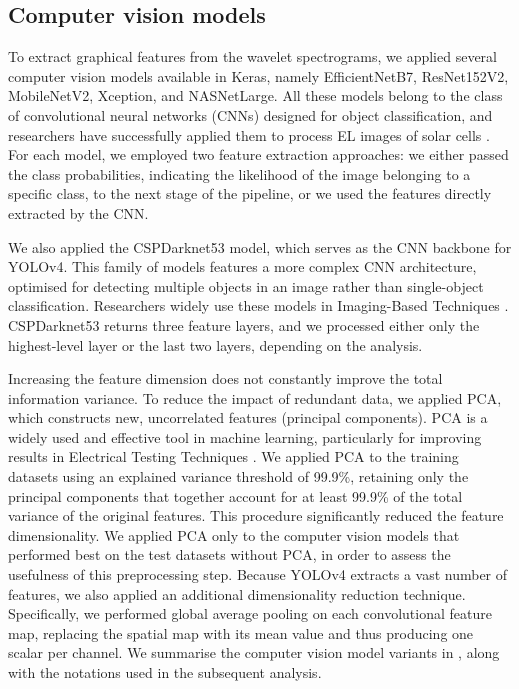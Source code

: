 \documentclass[10pt]{iopart}
\begin{document}
\subsection{Computer vision models}\label{subsec:CompVisMod}

To extract graphical features from the wavelet spectrograms, we applied several computer vision models available in Keras, namely EfficientNetB7, ResNet152V2, MobileNetV2, Xception, and NASNetLarge. 
All these models belong to the class of convolutional neural networks (CNNs) designed for object classification, and researchers have successfully applied them to process EL images of solar cells \cite{Jia2024, Otamendi2021, Chen2022, Abdelsattar2025, tella2025}. 
For each model, we employed two feature extraction approaches: we either passed the class probabilities, indicating the likelihood of the image belonging to a specific class, to the next stage of the pipeline, or we used the features directly extracted by the CNN.


We also applied the CSPDarknet53 model, which serves as the CNN backbone for YOLOv4. 
This family of models features a more complex CNN architecture, optimised for detecting multiple objects in an image rather than single-object classification. 
Researchers widely use these models in Imaging-Based Techniques \cite{Liu2024a, Li2024a, Chen2022}. 
CSPDarknet53 returns three feature layers, and we processed either only the highest-level layer or the last two layers, depending on the analysis.


Increasing the feature dimension does not constantly improve the total information variance. 
To reduce the impact of redundant data, we applied PCA, which constructs new, uncorrelated features (principal components). 
PCA is a widely used and effective tool in machine learning, particularly for improving results in Electrical Testing Techniques \cite{Fadhel2019, Gao2020}.
We applied PCA to the training datasets using an explained variance threshold of 99.9\%, retaining only the principal components that together account for at least 99.9\% of the total variance of the original features. 
This procedure significantly reduced the feature dimensionality. 
We applied PCA only to the computer vision models that performed best on the test datasets without PCA, in order to assess the usefulness of this preprocessing step.
Because YOLOv4 extracts a vast number of features, we also applied an additional dimensionality reduction technique. 
Specifically, we performed global average pooling on each convolutional feature map, replacing the spatial map with its mean value and thus producing one scalar per channel.
We summarise the computer vision model variants in , along with the notations used in the subsequent analysis.
\end{document}
